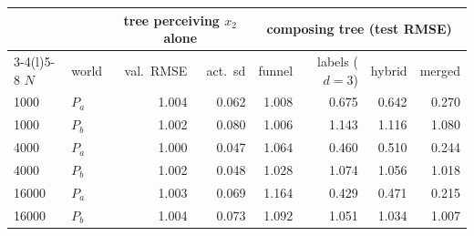 \begin{tabular}{@{}llrrrrrr@{}}\toprule
& & \multicolumn{2}{c}{tree perceiving $x_2$ alone} & \multicolumn{4}{c}{composing tree (test RMSE)}\\
\cmidrule(lr){3-4}\cmidrule(l){5-8}
$N$ & world & val.\ RMSE & act.\ sd & funnel & labels ($d{=}3$) & hybrid & merged\\\midrule
1000 & $P_a$ & 1.004 & 0.062 & 1.008 & 0.675 & 0.642 & 0.270\\
1000 & $P_b$ & 1.002 & 0.080 & 1.006 & 1.143 & 1.116 & 1.080\\
4000 & $P_a$ & 1.000 & 0.047 & 1.064 & 0.460 & 0.510 & 0.244\\
4000 & $P_b$ & 1.002 & 0.048 & 1.028 & 1.074 & 1.056 & 1.018\\
16000 & $P_a$ & 1.003 & 0.069 & 1.164 & 0.429 & 0.471 & 0.215\\
16000 & $P_b$ & 1.004 & 0.073 & 1.092 & 1.051 & 1.034 & 1.007\\
\bottomrule\end{tabular}